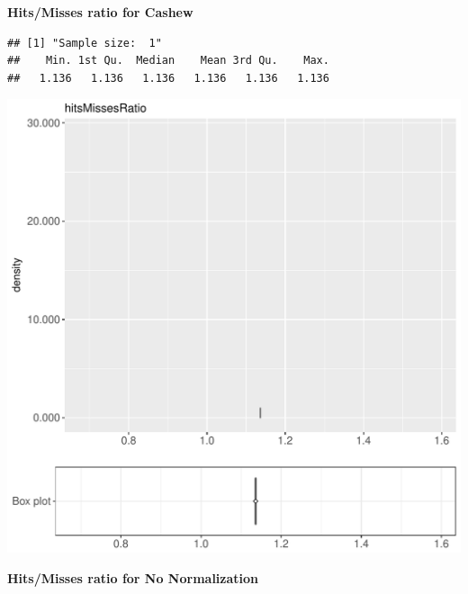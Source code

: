 \documentclass{article}\usepackage[]{graphicx}\usepackage[]{color}
\makeatletter
\def\maxwidth{ %
  \ifdim\Gin@nat@width>\linewidth
    \linewidth
  \else
    \Gin@nat@width
  \fi
}
\newenvironment{kframe}{%
 \def\at@end@of@kframe{}%
 \ifinner\ifhmode%
  \def\at@end@of@kframe{\end{minipage}}%
  \begin{minipage}{\columnwidth}%
 \fi\fi%
 \def\FrameCommand##1{\hskip\@totalleftmargin \hskip-\fboxsep
 \colorbox{shadecolor}{##1}\hskip-\fboxsep
     \hskip-\linewidth \hskip-\@totalleftmargin \hskip\columnwidth}%
 \MakeFramed {\advance\hsize-\width
   \@totalleftmargin\z@ \linewidth\hsize
   \@setminipage}}%
 {\par\unskip\endMakeFramed%
 \at@end@of@kframe}
\newenvironment{knitrout}{}{} %
\makeatother
\begin{document}
 \textbf{Hits/Misses ratio for Cashew}
\begin{knitrout}
\color{fgcolor}\begin{kframe}
\begin{verbatim}
## [1] "Sample size:  1"
##    Min. 1st Qu.  Median    Mean 3rd Qu.    Max. 
##   1.136   1.136   1.136   1.136   1.136   1.136
\end{verbatim}


{\ttfamily\noindent\bfseries{}}\end{kframe}
\includegraphics[width=\maxwidth]{figure/RH5_cashew_obscure-1} 

\end{knitrout}
 \textbf{Hits/Misses ratio for No Normalization}
\end{document}
